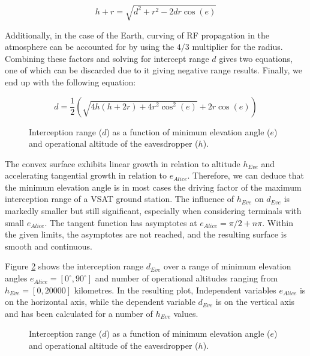 \documentclass[english, 12pt, a4paper, elec, utf8, a-1b, online]{aaltothesis}
\begin{document}
\begin{equation} \label{eq-range-3}
  h + r = \sqrt{d^2 + r^2 - 2 d r \cos(e)}
\end{equation}

Additionally, in the case of the Earth, curving of RF propagation in the atmosphere can be accounted for by using the $4/3$ multiplier for the radius. Combining these factors and solving for intercept range $d$ gives two equations, one of which can be discarded due to it giving negative range results. Finally, we end up with the following equation:

\begin{equation} \label{eq-range-4}
  d = \frac{1}{2} (\sqrt{4 h (h + 2 r) + 4 r^2 \cos^2(e)} + 2 r \cos(e))
\end{equation}

\begin{figure}[h]
  \centering
  
  \caption{Interception range ($d$) as a function of minimum elevation angle ($e$) and operational altitude of the eavesdropper ($h$).}
  \label{fig-interception-range-2d}
\end{figure}

The convex surface exhibits linear growth in relation to altitude $h_{Eve}$ and accelerating tangential growth in relation to $e_{Alice}$.
Therefore, we can deduce that the minimum elevation angle is in most cases the driving factor of the maximum interception range of a VSAT ground station.
The influence of $h_{Eve}$ on $d_{Eve}$ is markedly smaller but still significant, especially when considering terminals with small $e_{Alice}$.
The tangent function has asymptotes at $e_{Alice} = \pi / 2 + n\pi$. Within the given limits, the asymptotes are not reached, and the resulting surface is smooth and continuous.

Figure \ref{fig-interception-range-3d} shows the interception range $d_{Eve}$ over a range of minimum elevation angles $e_{Alice} = [0^\circ, 90^\circ]$ and number of operational altitudes ranging from $h_{Eve} = [0,20000]$ kilometres. %
In the resulting plot,
Independent variables $e_{Alice}$ is on the horizontal axis, while the dependent variable $d_{Eve}$ is on the vertical axis and has been calculated for a number of $h_{Eve}$ values.

\begin{figure}[h]
  \centering
  
  \caption{Interception range ($d$) as a function of minimum elevation angle ($e$) and operational altitude of the eavesdropper ($h$).}
  \label{fig-interception-range-3d}
\end{figure}
\end{document}
